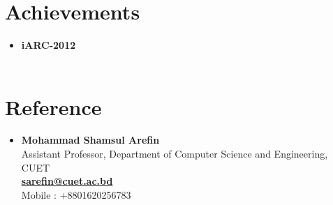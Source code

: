 \documentclass[letterpaper,11pt]{article}
\newcommand{\resumeSubHeadingListStart}{\begin{itemize}[leftmargin=*]}
\newcommand{\resumeSubHeadingListEnd}{\end{itemize}}
\begin{document}
\section{Achievements}
 \resumeSubHeadingListStart
	 \item  \textbf{iARC-2012}\\
	     \smallskip 
	  \hspace{20pt}{Champion in  Bangladesh Round.}\\
	  \hspace{20pt}{Fourth Position in International Round. (IIT, Kanpur)}
  \resumeSubHeadingListEnd

%

\section{Reference}
 \resumeSubHeadingListStart
  \item  \textbf{Mohammad Shamsul Arefin} \\Assistant Professor, Department of Computer Science and Engineering, CUET\\
  \href{mailto:sarefin@cuet.ac.bd}{\textbf{sarefin@cuet.ac.bd}}  \\
  Mobile : +8801620256783 \\
   
 \resumeSubHeadingListEnd


\end{document}
